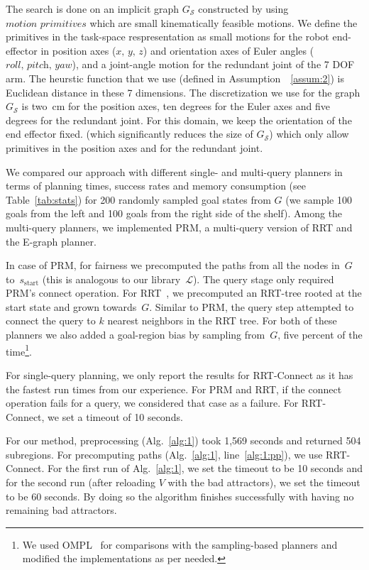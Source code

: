 \documentclass[letterpaper]{article} %
\newcommand{\calL}{\ensuremath{\mathcal{L}}\xspace}
\newcommand{\calS}{\ensuremath{\mathcal{S}}\xspace}
\newcommand{\update}[1]{{\color{magenta}#1}}  %
\begin{document}
The search is done on an implicit graph $G_\calS$ constructed by using $\textit{motion primitives}$ which are small kinematically feasible motions. We define the primitives in the task-space respresentation as small motions for the robot end-effector in position axes ($\textit{x, y, z}$) and orientation axes of Euler angles ($\textit{roll, pitch, yaw}$), and a joint-angle motion for the redundant joint of the 7 DOF arm. The heurstic function that we use (defined in Assumption~~\ref{assum:2}) is Euclidean distance in these 7 dimensions. The discretization we use for the graph $G_\calS$ is two~cm for the position axes, ten degrees for the Euler axes and five degrees for the redundant joint. 
For this domain, 
\update{we keep the orientation of the end effector fixed.
 (which significantly reduces the size of $G_\calS$) which only allow primitives in the position axes and for the redundant joint.}

We compared our approach with different single- and multi-query planners in terms of planning times, success rates and memory consumption (see Table~\ref{tab:stats}) for 200 randomly sampled goal states from $G$ (we sample 100 goals from the left and 100 goals from the right side of the shelf). Among the multi-query planners, we implemented \textsf{PRM}, a multi-query version of \textsf{RRT} and the E-graph planner. 

In case of \textsf{PRM}, for fairness we precomputed the paths from all the nodes in~$G$ to~$s_{\text{start}}$ (this is analogous to our library~$\calL$). 
The query stage only required \textsf{PRM}'s connect operation. 
For \textsf{RRT}~\cite{LK01}, we precomputed an \textsf{RRT}-tree rooted at the start state and grown towards~$G$. Similar to \textsf{PRM}, the query step attempted to connect the query to $k$ nearest neighbors in the \textsf{RRT} tree. For both of these planners we also added a goal-region bias by sampling from~$G$, five percent of the time\footnote{We used OMPL~\cite{SMK12} for comparisons with the sampling-based planners and modified the implementations as per needed.}. 

For single-query planning, we only report the results for \textsf{RRT}-Connect as it has the fastest run times from our experience. For \textsf{PRM} and \textsf{RRT}, if the connect operation fails for a query, we considered that case as a failure. For \textsf{RRT}-Connect, we set a timeout of 10 seconds.

For our method, preprocessing (Alg.~\ref{alg:1}) took 1,569 seconds and returned 504 subregions. For precomputing paths (Alg.~\ref{alg:1}, line~\ref{alg:1:pp}), we use \textsf{RRT}-Connect. For the first run of Alg.~\ref{alg:1}, we set the timeout to be 10 seconds and for the second run (after reloading $V$ with the bad attractors), we set the timeout to be 60 seconds. By doing so the algorithm finishes successfully with having no remaining bad attractors.
\end{document}

